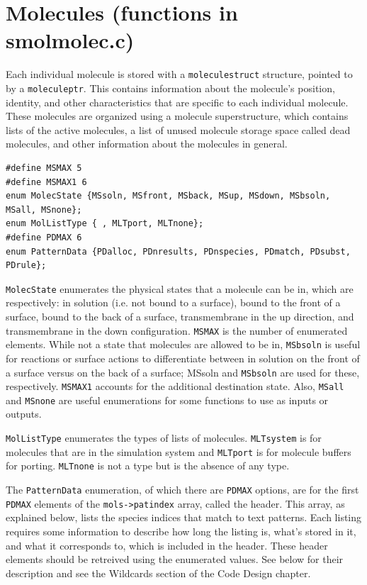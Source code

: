 \documentclass {scrbook}
\newcommand {\ttt} {\texttt}
\begin{document}
\section{Molecules (functions in smolmolec.c)}

Each individual molecule is stored with a \ttt{moleculestruct} structure, pointed to by a \ttt{moleculeptr}. This contains information about the molecule's position, identity, and other characteristics that are specific to each individual molecule. These molecules are organized using a molecule superstructure, which contains lists of the active molecules, a list of unused molecule storage space called dead molecules, and other information about the molecules in general.

\begin{lstlisting}
#define MSMAX 5
#define MSMAX1 6
enum MolecState {MSsoln, MSfront, MSback, MSup, MSdown, MSbsoln, MSall, MSnone};
enum MolListType { , MLTport, MLTnone};
#define PDMAX 6
enum PatternData {PDalloc, PDnresults, PDnspecies, PDmatch, PDsubst, PDrule};
\end{lstlisting}

\ttt{MolecState} enumerates the physical states that a molecule can be in, which are respectively: in solution (i.e. not bound to a surface), bound to the front of a surface, bound to the back of a surface, transmembrane in the up direction, and transmembrane in the down configuration. \ttt{MSMAX} is the number of enumerated elements. While not a state that molecules are allowed to be in, \ttt{MSbsoln} is useful for reactions or surface actions to differentiate between in solution on the front of a surface versus on the back of a surface; MSsoln and \ttt{MSbsoln} are used for these, respectively. \ttt{MSMAX1} accounts for the additional destination state. Also, \ttt{MSall} and \ttt{MSnone} are useful enumerations for some functions to use as inputs or outputs.

\ttt{MolListType} enumerates the types of lists of molecules. \ttt{MLTsystem} is for molecules that are in the simulation system and \ttt{MLTport} is for molecule buffers for porting. \ttt{MLTnone} is not a type but is the absence of any type.

The \ttt{PatternData} enumeration, of which there are \ttt{PDMAX} options, are for the first \ttt{PDMAX} elements of the \ttt{mols->patindex} array, called the header. This array, as explained below, lists the species indices that match to text patterns. Each listing requires some information to describe how long the listing is, what's stored in it, and what it corresponds to, which is included in the header. These header elements should be retreived using the enumerated values. See below for their description and see the Wildcards section of the Code Design chapter.
\end{document}

